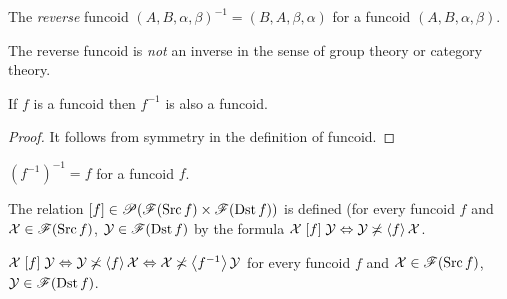 \begin{defn}
The \emph{reverse} funcoid
$(A,B,\alpha,\beta)^{-1}=(B,A,\beta,\alpha)$
for a funcoid $(A,B,\alpha,\beta)$.\end{defn}
\begin{note}
The reverse funcoid is \emph{not} an inverse in the sense of group
theory or category theory.\end{note}
\begin{prop}
If $f$ is a funcoid then $f^{-1}$ is also a funcoid.\end{prop}
\begin{proof}
It follows from symmetry in the definition of funcoid.\end{proof}
\begin{obvious}
$(f^{-1})^{-1}=f$ for a funcoid $f$.\end{obvious}
\begin{defn}
The relation $\mathord{\mathrel{\left[f\right]}}\in\mathscr{P}(\mathscr{F}(\operatorname{Src}
f)\times\mathscr{F}(\operatorname{Dst} f))$
is defined (for every funcoid $f$ and $\mathcal{X}\in\mathscr{F}(\operatorname{Src} f)$,
$\mathcal{Y}\in\mathscr{F}(\operatorname{Dst} f)$ by the formula $\mathcal{X}\mathrel{\left[f\right]}\mathcal{Y}\Leftrightarrow\mathcal{Y}\not\asymp\left\langle f\right\rangle\mathcal{X}$.\end{defn}
\begin{obvious}
$\mathcal{X}\mathrel{\left[f\right]}\mathcal{Y}\Leftrightarrow\mathcal{Y}\not\asymp\left\langle f\right\rangle\mathcal{X}\Leftrightarrow\mathcal{X}\not\asymp\left\langle f^{-1}\right\rangle\mathcal{Y}$
for every funcoid $f$ and $\mathcal{X}\in\mathscr{F}(\operatorname{Src} f)$,
$\mathcal{Y}\in\mathscr{F}(\operatorname{Dst} f)$.
\end{obvious}

